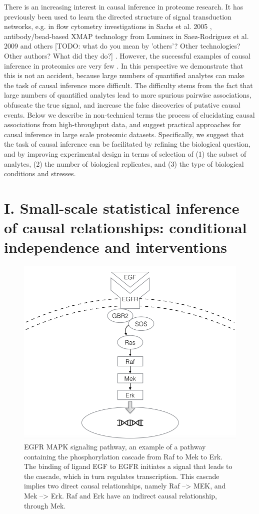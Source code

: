 \documentclass[journal=jacsat,manuscript=article]{achemso}
\def\todo#1{{\color{red}[TODO: #1]}}
\def\added#1{{\color{blue} #1}}
\begin{document}
\added{There is an increasing interest in causal inference in proteome research. It has previously been used to learn the directed structure of signal transduction networks, e.g. in flow cytometry investigations in Sachs et al. 2005 \cite{sachs2013single}, antibody/bead-based XMAP technology from Luminex in Saez-Rodriguez et al. 2009\cite{saez2009discrete} and others \todo{what do you mean by 'others'? Other technologies? Other authors? What did they do?} \cite{prill2011crowdsourcing}.
However, the successful examples of causal inference in proteomics are very few \cite{bensimon2012mass}. In this perspective we demonstrate that this is not an accident, because large numbers of quantified analytes can make the task of causal inference more difficult.  The difficulty stems from the fact that large numbers of quantified analytes  lead to more spurious pairwise associations, obfuscate the true signal, and increase the false discoveries of putative causal events. Below we describe in non-technical terms the process of elucidating causal associations from high-throughput data, and suggest practical approaches for causal inference in large scale proteomic datasets.  Specifically, we suggest that the task of causal inference can be facilitated by refining the biological question, and by improving experimental design in terms of selection of  (1) the subset of analytes, (2) the number of biological replicates, and (3) the type of biological conditions and stresses. }


\section{I. Small-scale statistical inference of causal relationships: conditional independence and interventions}

\begin{figure}[!tpb]
\centerline{\includegraphics[width=.5\textwidth]{figs/egfr.png}}
\caption{EGFR MAPK signaling pathway, an example of a pathway containing the phosphorylation cascade from Raf to Mek to Erk.  The binding of ligand EGF to EGFR initiates a signal that leads to the cascade, which in turn regulates transcription.  This cascade implies two direct causal relationships, namely Raf --> MEK, and Mek --> Erk.  Raf and Erk have an indirect causal relationship, through Mek.\label{mapk}}
\end{figure}
\end{document}
